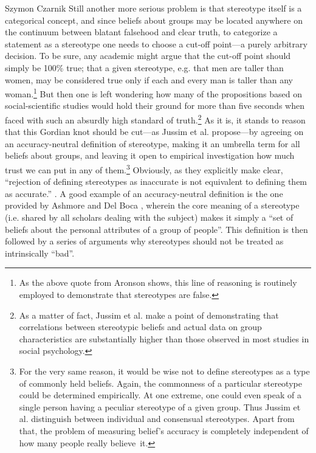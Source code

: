 \begin{artengenv}{Szymon Czarnik}
\enlargethispage{.5\baselineskip}
Still another more serious problem is that stereotype itself is a categorical concept, and since beliefs about groups may be located anywhere on the continuum between blatant falsehood and clear truth, to categorize a statement as a stereotype one needs to choose a cut-off point—a purely arbitrary decision. To be sure, any academic might argue that the cut-off point should simply be 100\% true; that a given stereotype, e.g. that men are taller than women, may be considered true only if each and every man is taller than any woman.\footnote{As the above quote from Aronson shows, this line of reasoning is routinely employed to demonstrate that stereotypes are false. } But then one is left wondering how many of the propositions based on social-scientific studies would hold their ground for more than five seconds when faced with such an absurdly high standard of truth.\footnote{As a matter of fact, Jussim et al.
\parencite*[][]{jussim_stereotype_2016} %
 make a point of demonstrating that correlations between stereotypic beliefs and actual data on group characteristics are substantially higher than those observed in most studies in social psychology. } As it is, it stands to reason that this Gordian knot should be cut—as Jussim et al. propose—by agreeing on an accuracy-neutral definition of stereotype, making it an umbrella term for all beliefs about groups, and leaving it open to empirical investigation how much trust we can put in any of them.\footnote{For the very same reason, it would be wise not to define stereotypes as a type of commonly held beliefs. Again, the commonness of a particular stereotype could be determined empirically. At one extreme, one could even speak of a single person having a peculiar stereotype of a given group. Thus Jussim et al. 
\parencite*[][]{jussim_stereotype_2016} %
 distinguish between individual and consensual stereotypes. Apart from that, the problem of measuring belief's accuracy is completely independent of how many people really believe~it.}
 Obviously, as they explicitly make clear, ``rejection of defining stereotypes as inaccurate is not equivalent to defining them as accurate.'' 
\parencite[][p.202]{jussim_stereotype_2016}. %
 A good example of an accuracy-neutral definition is the one provided by Ashmore and Del Boca 
\parencite*[][p.16]{hamilton_conceptual_1981}, %
 wherein the core meaning of a stereotype (i.e. shared by all scholars dealing with the subject) makes it simply a ``set of beliefs about the personal attributes of a group of people''. This definition is then followed by a series of arguments why stereotypes should not be treated as intrinsically ``bad''.


\end{artengenv}
